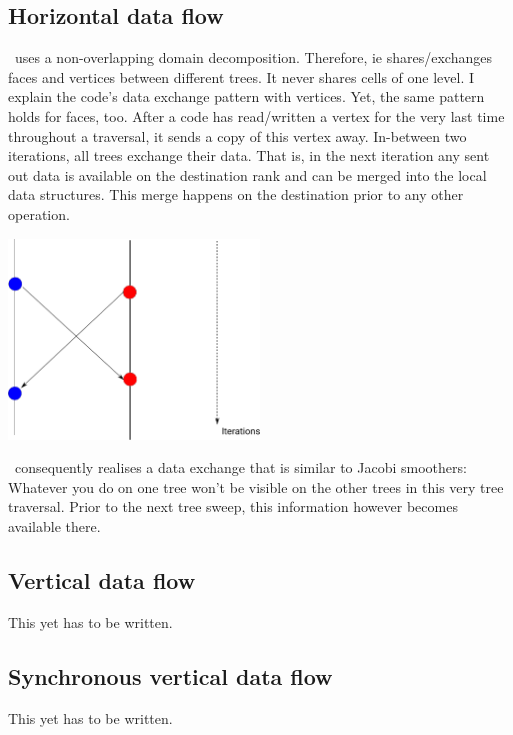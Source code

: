 \subsection{Horizontal data flow}

\Peano\ uses a non-overlapping domain decomposition.
Therefore, ie shares/exchanges faces and vertices between different trees.
It never shares cells of one level.
I explain the code's data exchange pattern with vertices.
Yet, the same pattern holds for faces, too.
After a code has read/written a vertex for the very last time throughout a
traversal, it sends a copy of this vertex away.
In-between two iterations, all trees exchange their data.
That is, in the next iteration any sent out data is available on the destination
rank and can be merged into the local data structures.
This merge happens on the destination prior to any other operation.


\begin{center}
 \includegraphics[width=0.5\textwidth]{51_domain-decomposition/boundary-data-flow.pdf}
\end{center}

\noindent
\Peano\ consequently realises a data exchange that is similar to Jacobi
smoothers:
Whatever you do on one tree won't be visible on the other trees in this very
tree traversal.
Prior to the next tree sweep, this information however becomes available there.


\subsection{Vertical data flow}

This yet has to be written.

\subsection{Synchronous vertical data flow}

This yet has to be written.


